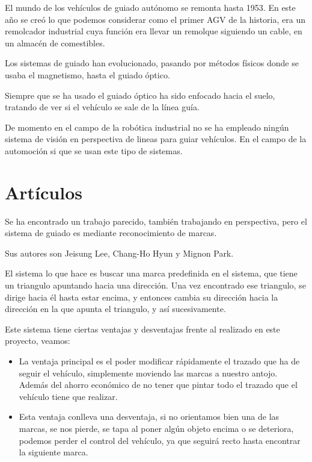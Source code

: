 El mundo de los vehículos de guiado autónomo se remonta hasta 1953. En este año se creó lo que podemos considerar como el primer AGV de la historia, era un remolcador industrial cuya función era llevar un remolque siguiendo un cable, en un almacén de comestibles\cite{primer_agv}. 

Los sistemas de guiado han evolucionado, pasando por métodos físicos donde se usaba el magnetismo, hasta el guiado óptico. 

Siempre que se ha usado el guiado óptico ha sido enfocado hacia el suelo, tratando de ver si el vehículo se sale de la línea guía.



De momento en el campo de la robótica industrial no se ha empleado ningún sistema de visión en perspectiva de lineas para guiar vehículos. En el campo de la automoción si que se usan este tipo de sistemas.

\section{Artículos}

Se ha encontrado un trabajo parecido, también trabajando en perspectiva, pero el sistema de guiado es mediante reconocimiento de marcas\cite{guiado_marcas}.

Sus autores son Jeisung Lee, Chang-Ho Hyun y Mignon Park. 

El sistema lo que hace es buscar una marca predefinida en el sistema, que tiene un triangulo apuntando hacia una dirección. Una vez encontrado ese triangulo, se dirige hacia él hasta estar encima, y entonces cambia su dirección hacia la dirección en la que apunta el triangulo, y así sucesivamente.

Este sistema tiene ciertas ventajas y desventajas frente al realizado en este proyecto, veamos:

\begin{itemize}
	\item La ventaja principal es el poder modificar rápidamente el trazado que ha de seguir el vehículo, simplemente moviendo las marcas a nuestro antojo. Además del ahorro económico de no tener que pintar todo el trazado que el vehículo tiene que realizar.
	
	\item Esta ventaja conlleva una desventaja, si no orientamos bien una de las marcas, se nos pierde, se tapa al poner algún objeto encima o se deteriora, podemos perder el control del vehículo, ya que seguirá recto hasta encontrar la siguiente marca.
	
\end{itemize}


